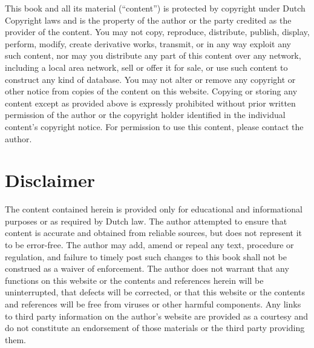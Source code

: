 \documentclass[
]{book}
\begin{document}
This book and all its material (``content'') is protected by copyright under Dutch Copyright laws and is the property of the author or the party credited as the provider of the content. You may not copy, reproduce, distribute, publish, display, perform, modify, create derivative works, transmit, or in any way exploit any such content, nor may you distribute any part of this content over any network, including a local area network, sell or offer it for sale, or use such content to construct any kind of database. You may not alter or remove any copyright or other notice from copies of the content on this website. Copying or storing any content except as provided above is expressly prohibited without prior written permission of the author or the copyright holder identified in the individual content's copyright notice. For permission to use this content, please contact the author.

\hypertarget{disclaimer}{%
\section{Disclaimer}\label{disclaimer}}

The content contained herein is provided only for educational and informational purposes or as required by Dutch law. The author attempted to ensure that content is accurate and obtained from reliable sources, but does not represent it to be error-free. The author may add, amend or repeal any text, procedure or regulation, and failure to timely post such changes to this book shall not be construed as a waiver of enforcement. The author does not warrant that any functions on this website or the contents and references herein will be uninterrupted, that defects will be corrected, or that this website or the contents and references will be free from viruses or other harmful components. Any links to third party information on the author's website are provided as a courtesy and do not constitute an endorsement of those materials or the third party providing them.

  
\end{document}
